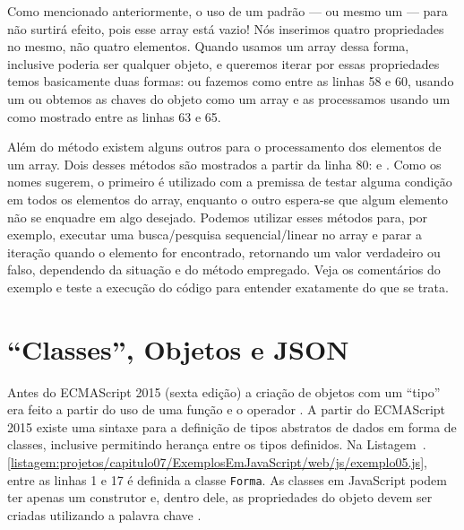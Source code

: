 Como mencionado anteriormente, o uso de um  padrão --- ou mesmo um  --- para  não surtirá efeito, pois esse array está vazio! Nós inserimos quatro propriedades no mesmo, não quatro elementos. Quando usamos um array dessa forma, inclusive poderia ser qualquer objeto, e queremos iterar por essas propriedades temos basicamente duas formas: ou fazemos como entre as linhas 58 e 60, usando um  ou obtemos as chaves do objeto como um array e as processamos usando um  como mostrado entre as linhas 63 e 65.

Além do método  existem alguns outros para o processamento dos elementos de um array. Dois desses métodos são mostrados a partir da linha 80:  e . Como os nomes sugerem, o primeiro é utilizado com a premissa de testar alguma condição em todos os elementos do array, enquanto o outro espera-se que algum elemento não se enquadre em algo desejado. Podemos utilizar esses métodos para, por exemplo, executar uma busca/pesquisa sequencial/linear no array e parar a iteração quando o elemento for encontrado, retornando um valor verdadeiro ou falso, dependendo da situação e do método empregado. Veja os comentários do exemplo e teste a execução do código para entender exatamente do que se trata.



\section{``Classes'', Objetos e JSON}

Antes do ECMAScript 2015 (sexta edição) a criação de objetos com um ``tipo'' era feito a partir do uso de uma função e o operador . A partir do ECMAScript 2015 existe uma sintaxe para a definição de tipos abstratos de dados em forma de classes, inclusive permitindo herança entre os tipos definidos. Na Listagem~\thechapter.\ref{listagem:projetos/capitulo07/ExemplosEmJavaScript/web/js/exemplo05.js}, entre as linhas 1 e 17 é definida a classe \texttt{Forma}. As classes em JavaScript podem ter apenas um construtor e, dentro dele, as propriedades do objeto devem ser criadas utilizando a palavra chave .


